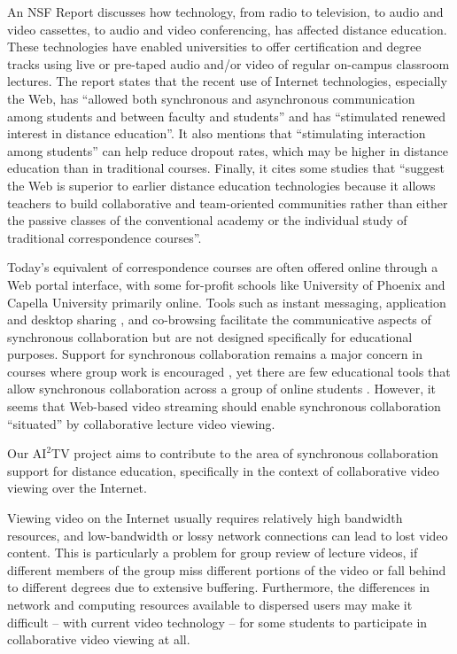 \documentclass{sig-alternate}
\begin{document}

An NSF Report \cite{NSFReport} discusses how technology, from radio to
television, to audio and video cassettes, to audio and video
conferencing, has affected distance education. These technologies have
enabled universities to offer certification and degree tracks using
live or pre-taped audio and/or video of regular on-campus classroom
lectures.  The report states that the recent use of Internet
technologies, especially the Web, has ``allowed both synchronous and
asynchronous communication among students and between faculty and
students'' and has ``stimulated renewed interest in distance
education''. It also mentions that ``stimulating interaction among
students'' can help reduce dropout rates, which may be higher in
distance education than in traditional courses. Finally, it cites some
studies that ``suggest the Web is superior to earlier distance
education technologies because it allows teachers to build
collaborative and team-oriented communities rather than either the
passive classes of the conventional academy or the individual study of
traditional correspondence courses''.

Today's equivalent of correspondence courses are often offered online
through a Web portal interface, with some for-profit schools like
University of Phoenix \cite{UPhoenix} and Capella University
\cite{Capella} primarily online.  Tools such as instant messaging,
application and desktop sharing \cite{WEBEX, VNC}, and co-browsing
\cite{CAPPS, LIEBERMAN, SIDLER} facilitate the communicative aspects
of synchronous collaboration but are not designed specifically for
educational purposes.  Support for synchronous collaboration remains a
major concern in courses where group work is encouraged \cite{WELLS},
yet there are few educational tools that allow synchronous
collaboration across a group of online students \cite{BURGESS}.
However, it seems that Web-based video streaming should enable
synchronous collaboration ``situated'' by collaborative lecture video
viewing.



Our $\mathrm{AI}^2$TV project aims to contribute to the area of
synchronous collaboration support for distance education, specifically
in the context of collaborative video viewing over the Internet.

Viewing video on the Internet usually requires relatively high
bandwidth resources, and low-bandwidth or lossy network connections
can lead to lost video content.  This is particularly a problem for
group review of lecture videos, if different members of the group miss
different portions of the video or fall behind to different degrees
due to extensive buffering.  Furthermore, the differences in network
and computing resources available to dispersed users may make it
difficult -- with current video technology -- for some students to
participate in collaborative video viewing at all.  
\end{document}
